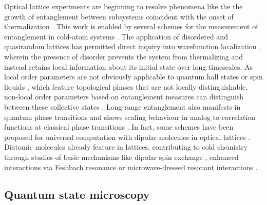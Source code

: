 	Optical lattice experiments are beginning to resolve phenomena like the the growth of entanglement between subsystems coincident with the onset of thermalization \cite{Clos16,Kaufman16}.
	This work is enabled by several schemes for the measurement of entanglement in cold-atom systems \cite{Chiu18,Brydges19,Daley12,Mouraalves04}.
	The application of disordered and quasirandom lattices has permitted direct inquiry into wavefunction localization \cite{Anderson58,Dalessio16,Goold16,Srednicki94,Clos16,Kaufman16,Nandkishore15}, wherein the presence of disorder prevents the system from thermalizing and instead retains local information about its initial state over long timescales.
	As local order parameters are not obviously applicable to quantum hall states or spin liquids \cite{Isakov11}, which feature topological phases that are not locally distinguishable, non-local order parameters based on entanglement measures can distinguish between these collective states \cite{Isakov11,Jiang12}.
	Long-range entanglement also manifests in quantum phase transitions \cite{Osborne02} and shows scaling behaviour in analog to correlation functions at classical phase transitions \cite{Osterloh02}.
	In fact, some schemes have been proposed for universal computation with dipolar molecules in optical lattices \cite{Yelin06, Micheli06}.
	Diatomic molecules already feature in lattices, contributing to cold chemistry \cite{Balakrishnan16} through studies of basic mechanisms like dipolar spin exchange \cite{Yan13}, enhanced interactions via Feshbach resonance \cite{Yang19} or microwave-dressed resonant interactions \cite{Yan20}.
	
\subsection{Quantum state microscopy}

